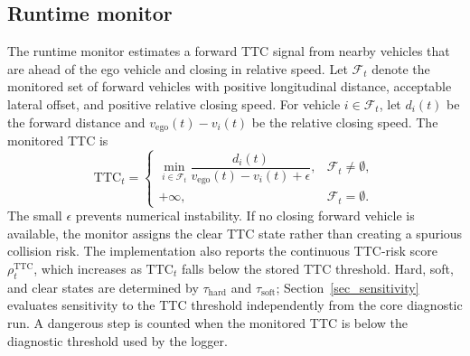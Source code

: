 \documentclass[pdflatex,sn-mathphys-ay]{sn-jnl}
\begin{document}
\subsection{Runtime monitor}\label{sec_ttc_monitor}
The runtime monitor estimates a forward TTC signal from nearby vehicles that are ahead of the ego vehicle and closing in relative speed. Let $\mathcal{F}_t$ denote the monitored set of forward vehicles with positive longitudinal distance, acceptable lateral offset, and positive relative closing speed. For vehicle $i\in\mathcal{F}_t$, let $d_i(t)$ be the forward distance and $v_{\mathrm{ego}}(t)-v_i(t)$ be the relative closing speed. The monitored TTC is
\begin{equation}
\mathrm{TTC}_t=
\begin{cases}
\min_{i\in\mathcal{F}_t}\dfrac{d_i(t)}{v_{\mathrm{ego}}(t)-v_i(t)+\epsilon}, & \mathcal{F}_t\neq\emptyset,\\
+\infty, & \mathcal{F}_t=\emptyset.
\end{cases}
\end{equation}
The small $\epsilon$ prevents numerical instability. If no closing forward vehicle is available, the monitor assigns the clear TTC state rather than creating a spurious collision risk. The implementation also reports the continuous TTC-risk score $\rho_t^{\mathrm{TTC}}$, which increases as $\mathrm{TTC}_t$ falls below the stored TTC threshold. Hard, soft, and clear states are determined by $\tau_{\mathrm{hard}}$ and $\tau_{\mathrm{soft}}$; Section~\ref{sec_sensitivity} evaluates sensitivity to the TTC threshold independently from the core diagnostic run. A dangerous step is counted when the monitored TTC is below the diagnostic threshold used by the logger.
\end{document}
